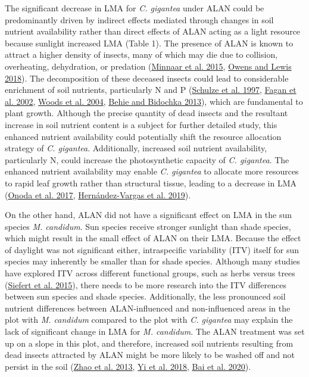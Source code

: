 \documentclass[
  12pt,
  letterpaper,
  DIV=11,
  numbers=noendperiod]{scrartcl}
\begin{document}
The significant decrease in LMA for \emph{C. gigantea} under ALAN could
be predominantly driven by indirect effects mediated through changes in
soil nutrient availability rather than direct effects of ALAN acting as
a light resource because sunlight increased LMA (Table 1). The presence
of ALAN is known to attract a higher density of insects, many of which
may die due to collision, overheating, dehydration, or predation
(\protect\hyperlink{ref-Minnaar2015}{Minnaar et al. 2015},
\protect\hyperlink{ref-Owens2018}{Owens and Lewis 2018}). The
decomposition of these deceased insects could lead to considerable
enrichment of soil nutrients, particularly N and P
(\protect\hyperlink{ref-Schulze1997}{Schulze et al. 1997},
\protect\hyperlink{ref-Fagan2002}{Fagan et al. 2002},
\protect\hyperlink{ref-Woods2004}{Woods et al. 2004},
\protect\hyperlink{ref-Behie2013}{Behie and Bidochka 2013}), which are
fundamental to plant growth. Although the precise quantity of dead
insects and the resultant increase in soil nutrient content is a subject
for further detailed study, this enhanced nutrient availability could
potentially shift the resource allocation strategy of \emph{C.
gigantea}. Additionally, increased soil nutrient availability,
particularly N, could increase the photosynthetic capacity of \emph{C.
gigantea}. The enhanced nutrient availability may enable \emph{C.
gigantea} to allocate more resources to rapid leaf growth rather than
structural tissue, leading to a decrease in LMA
(\protect\hyperlink{ref-Onoda2017}{Onoda et al. 2017},
\protect\hyperlink{ref-Hernandez-Vargas2019}{Hernández-Vargas et al.
2019}).

On the other hand, ALAN did not have a significant effect on LMA in the
sun species \emph{M. candidum}. Sun species receive stronger sunlight
than shade species, which might result in the small effect of ALAN on
their LMA. Because the effect of daylight was not significant either,
intraspecific variability (ITV) itself for sun species may inherently be
smaller than for shade species. Although many studies have explored ITV
across different functional groups, such as herbs versus trees
(\protect\hyperlink{ref-Siefert2015}{Siefert et al. 2015}), there needs
to be more research into the ITV differences between sun species and
shade species. Additionally, the less pronounced soil nutrient
differences between ALAN-influenced and non-influenced areas in the plot
with \emph{M. candidum} compared to the plot with \emph{C. gigantea} may
explain the lack of significant change in LMA for \emph{M. candidum}.
The ALAN treatment was set up on a slope in this plot, and therefore,
increased soil nutrients resulting from dead insects attracted by ALAN
might be more likely to be washed off and not persist in the soil
(\protect\hyperlink{ref-Zhao2013}{Zhao et al. 2013},
\protect\hyperlink{ref-Yi2018}{Yi et al. 2018},
\protect\hyperlink{ref-Bai2020}{Bai et al. 2020}).
\end{document}
